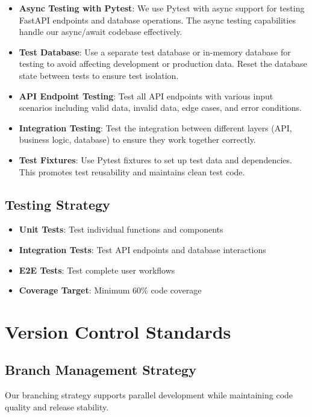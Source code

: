 \documentclass[12pt]{article}
\begin{document}
\begin{itemize}
    \item \textbf{Async Testing with Pytest}: We use Pytest with async support for testing FastAPI endpoints and database operations. The async testing capabilities handle our async/await codebase effectively.
    
    \item \textbf{Test Database}: Use a separate test database or in-memory database for testing to avoid affecting development or production data. Reset the database state between tests to ensure test isolation.
    
    \item \textbf{API Endpoint Testing}: Test all API endpoints with various input scenarios including valid data, invalid data, edge cases, and error conditions.
    
    \item \textbf{Integration Testing}: Test the integration between different layers (API, business logic, database) to ensure they work together correctly.
    
    \item \textbf{Test Fixtures}: Use Pytest fixtures to set up test data and dependencies. This promotes test reusability and maintains clean test code.
\end{itemize}

\subsection{Testing Strategy}
\begin{itemize}
    \item \textbf{Unit Tests}: Test individual functions and components
    \item \textbf{Integration Tests}: Test API endpoints and database interactions
    \item \textbf{E2E Tests}: Test complete user workflows
    \item \textbf{Coverage Target}: Minimum 60\% code coverage
\end{itemize}

\section{Version Control Standards}

\subsection{Branch Management Strategy}
Our branching strategy supports parallel development while maintaining code quality and release stability.
\end{document}
